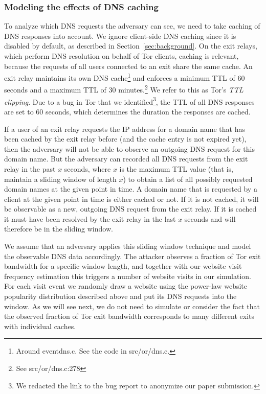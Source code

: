 \subsubsection{Modeling the effects of DNS caching}
To analyze which DNS requests the adversary can see, we need to
take caching of DNS responses into account. We ignore client-side DNS
caching since it is disabled by default, as described in
Section~\ref{sec:background}.
On the exit relays, which perform DNS resolution on behalf of Tor clients, caching
is relevant, because the requests of all users connected to an exit
share the same cache. An exit
relay maintains its own DNS cache\footnote{Around eventdns.c.  See the
		code in src/or/dns.c.} and enforces a minimum TTL of 60 seconds
and a maximum TTL of 30 minutes.\footnote{See src/or/dns.c:278}  We
refer to this as Tor's \emph{TTL clipping}. Due to a
bug in Tor that we identified\footnote{We redacted the link to the bug report to anonymize our paper
submission.},
the TTL of all DNS responses are set to 60 seconds, which determines
the duration the responses are cached.

If a user of an exit relay requests the IP address for a domain name
that has been cached by the exit relay before (and the cache entry is
not expired yet), then the adversary will not be able to observe an
outgoing DNS request for this domain name. But the adversary can
recorded all DNS requests from the exit relay in the past $x$ seconds,
where $x$ is the maximum TTL value (that is, maintain a sliding window of
length $x$) to obtain a list of all possibly requested domain names at the
given point in time. A domain name that is requested by a client at the
given point in time is either cached or not. If it is
not cached, it will be observable as a new, outgoing DNS
request from the exit relay. If it is cached it must
have been resolved by the exit relay in the last $x$ seconds and will
therefore be in the sliding window.

We assume that an adversary applies this sliding window technique and
model the observable DNS data accordingly.
The attacker observes a fraction of Tor exit bandwidth
for a specific window length,
and together with our website visit frequency estimation
this triggers a number of website visits in our simulation.
For each visit event we randomly draw a website using the
power-law website popularity distribution described above and put its
DNS requests into the window. As we will see next, we do not need to
simulate or consider the fact that the observed fraction of Tor exit bandwidth
corresponds to many different exits with individual caches.

